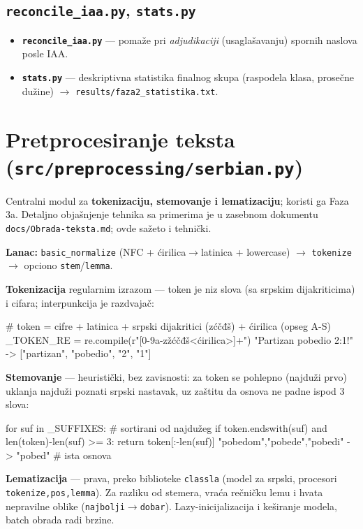 \documentclass[11pt,a4paper]{article}
\newcommand{\fajl}[1]{\textbf{\texttt{#1}}}
\newcommand{\kod}[1]{\texttt{#1}}
\begin{document}
\subsection{\texttt{reconcile\_iaa.py}, \texttt{stats.py}}
\begin{itemize}[nosep]
  \item \fajl{reconcile\_iaa.py} --- pomaže pri \emph{adjudikaciji} (usaglašavanju)
    spornih naslova posle IAA.
  \item \fajl{stats.py} --- deskriptivna statistika finalnog skupa (raspodela klasa,
    prosečne dužine) $\to$ \kod{results/faza2\_statistika.txt}.
\end{itemize}

\section{Pretprocesiranje teksta (\texttt{src/preprocessing/serbian.py})}
Centralni modul za \textbf{tokenizaciju, stemovanje i lematizaciju}; koristi ga Faza
3a. Detaljno objašnjenje tehnika sa primerima je u zasebnom dokumentu
\texttt{docs/Obrada-teksta.md}; ovde sažeto i tehnički.

\textbf{Lanac:} \kod{basic\_normalize} (NFC + ćirilica$\to$latinica + lowercase)
$\to$ \kod{tokenize} $\to$ opciono \kod{stem}/\kod{lemma}.

\textbf{Tokenizacija} regularnim izrazom --- token je niz slova (sa srpskim
dijakriticima) i cifara; interpunkcija je razdvajač:
\begin{code}
# token = cifre + latinica + srpski dijakritici (zćčđš) + ćirilica (opseg A-S)
_TOKEN_RE = re.compile(r"[0-9a-zžćčđš<ćirilica>]+")
"Partizan pobedio 2:1!" -> ["partizan", "pobedio", "2", "1"]
\end{code}

\textbf{Stemovanje} --- heuristički, bez zavisnosti: za token se pohlepno (najduži
prvo) uklanja najduži poznati srpski nastavak, uz zaštitu da osnova ne padne ispod 3
slova:
\begin{code}
for suf in _SUFFIXES:                       # sortirani od najdužeg
    if token.endswith(suf) and len(token)-len(suf) >= 3:
        return token[:-len(suf)]
"pobedom","pobede","pobedi" -> "pobed"      # ista osnova
\end{code}

\textbf{Lematizacija} --- prava, preko biblioteke \kod{classla} (model za srpski,
procesori \kod{tokenize,pos,lemma}). Za razliku od stemera, vraća rečničku lemu i
hvata nepravilne oblike (\kod{najbolji}$\to$\kod{dobar}). Lazy-inicijalizacija i
keširanje modela, batch obrada radi brzine.
\end{document}
